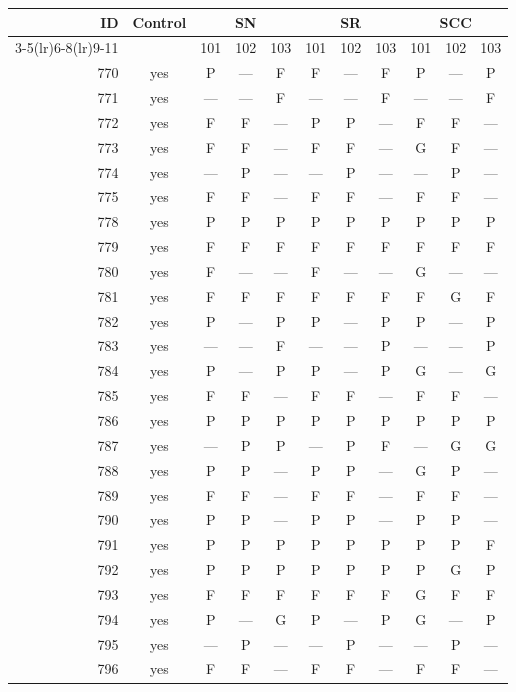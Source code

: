 \begin{table}[p]\centering\small
\begin{tabular*}{\textwidth}{@{\extracolsep{\fill}}rc*{9}{c}@{}}\toprule
ID & Control & \multicolumn{3}{c}{SN} & \multicolumn{3}{c}{SR} & \multicolumn{3}{c}{SCC}\\
\cmidrule(lr){3-5}\cmidrule(lr){6-8}\cmidrule(lr){9-11}
 & & 101 & 102 & 103 & 101 & 102 & 103 & 101 & 102 & 103\\\midrule
770 & yes & P & — & F & F & — & F & P & — & P\\
771 & yes & — & — & F & — & — & F & — & — & F\\
772 & yes & F & F & — & P & P & — & F & F & —\\
773 & yes & F & F & — & F & F & — & G & F & —\\
774 & yes & — & P & — & — & P & — & — & P & —\\
775 & yes & F & F & — & F & F & — & F & F & —\\
778 & yes & P & P & P & P & P & P & P & P & P\\
779 & yes & F & F & F & F & F & F & F & F & F\\
780 & yes & F & — & — & F & — & — & G & — & —\\
781 & yes & F & F & F & F & F & F & F & G & F\\
782 & yes & P & — & P & P & — & P & P & — & P\\
783 & yes & — & — & F & — & — & P & — & — & P\\
784 & yes & P & — & P & P & — & P & G & — & G\\
785 & yes & F & F & — & F & F & — & F & F & —\\
786 & yes & P & P & P & P & P & P & P & P & P\\
787 & yes & — & P & P & — & P & F & — & G & G\\
788 & yes & P & P & — & P & P & — & G & P & —\\
789 & yes & F & F & — & F & F & — & F & F & —\\
790 & yes & P & P & — & P & P & — & P & P & —\\
791 & yes & P & P & P & P & P & P & P & P & F\\
792 & yes & P & P & P & P & P & P & P & G & P\\
793 & yes & F & F & F & F & F & F & G & F & F\\
794 & yes & P & — & G & P & — & P & G & — & P\\
795 & yes & — & P & — & — & P & — & — & P & —\\
796 & yes & F & F & — & F & F & — & F & F & —\\

\end{tabular*}
\end{table}
